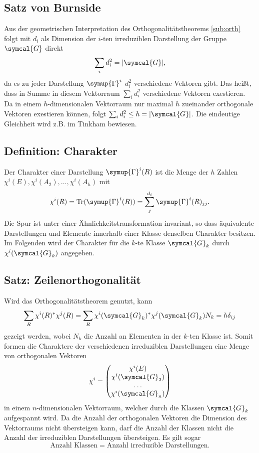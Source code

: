 \documentclass[
  captions=tableheading,  %
  titlepage=firstiscover, %
]{scrartcl}
\begin{document}
\subsection{Satz von Burnside}
Aus der geometrischen Interpretation des Orthogonalitätstheorems \ref{sub:orth} folgt 
mit $d_i$ als Dimension der $i$-ten irreduziblen Darstellung der Gruppe $\symcal{G}$ direkt
\begin{equation*}
  \sum_i d_i^2 = |\symcal{G}|,
\end{equation*}
da es zu jeder Darstellung $\symup{\Gamma}^i$ $d_i^2$ verschiedene Vektoren gibt. 
Das heißt, dass in Summe in diesem Vektorraum $\sum_i d_i^2$ verschiedene Vektoren exestieren.
Da in einem $h$-dimensionalen Vektorraum nur maximal $h$ zueinander orthogonale Vektoren exestieren können,
folgt $\sum_i d_i^2 \leq h = |\symcal{G}|$. 
Die eindeutige Gleichheit wird z.B. im Tinkham bewiesen.
\subsection{Definition: Charakter}
Der Charakter einer Darstellung $\symup{\Gamma}^i(R)$ ist die Menge
der $h$ Zahlen $\chi^i(E), \chi^i(A_2), \ldots, \chi^i(A_h)$ mit
\begin{equation*}
  \chi^i(R) = \text{Tr}(\symup{\Gamma}^i(R)) = \sum_j^{d_i} \symup{\Gamma}^i(R)_{jj}.
\end{equation*}
Die Spur ist unter einer Ähnlichkeitstransformation invariant, so dass äquivalente Darstellungen und 
Elemente innerhalb einer Klasse denselben Charakter besitzen.
Im Folgenden wird der Charakter für die $k$-te Klasse $\symcal{G}_k$ durch $\chi^i(\symcal{G}_k)$ angegeben.
\subsection{Satz: Zeilenorthogonalität}
Wird das Orthogonalitätstheorem genutzt, kann 
\begin{equation*}
  \sum_R \chi^i(R)^* \chi^j(R) = \sum_R \chi^i(\symcal{G}_k)^* \chi^j(\symcal{G}_k) N_k = h \delta_{ij}
\end{equation*}
gezeigt werden, wobei $N_k$ die Anzahl an Elementen in der $k$-ten Klasse ist.
Somit formen die Charaktere der verschiedenen irreduziblen Darstellungen eine Menge von orthogonalen Vektoren 
\begin{equation*}
\chi^i = 
\begin{pmatrix}
  \chi^i(E       )\\
  \chi^i(\symcal{G}_2     )\\
  \ldots          \\
  \chi^i(\symcal{G}_n     )
\end{pmatrix}
\end{equation*}  
in einem $n$-dimensionalen Vektorraum, welcher durch die Klassen $\symcal{G}_k$ aufgespannt wird.
Da die Anzahl der orthogonalen Vektoren die Dimension des Vektorraums nicht übersteigen kann,
darf die Anzahl der Klassen nicht die Anzahl der irreduziblen Darstellungen übersteigen.
Es gilt sogar
\begin{equation*}
  \text{Anzahl Klassen} = \text{Anzahl irreduzible Darstellungen}.
\end{equation*}
\end{document}
